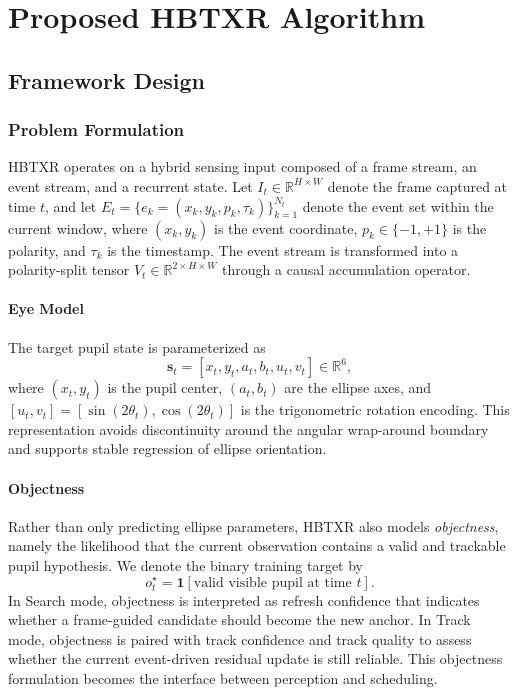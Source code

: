 \documentclass[journal]{IEEEtran}
\newcommand{\R}{\mathbb{R}}
\begin{document}
\section{Proposed HBTXR Algorithm}
\subsection{Framework Design}
\subsubsection{Problem Formulation}
HBTXR operates on a hybrid sensing input composed of a frame stream, an event stream, and a recurrent state. Let $I_t \in \R^{H\times W}$ denote the frame captured at time $t$, and let $E_t = \{e_k=(x_k,y_k,p_k,\tau_k)\}_{k=1}^{N_t}$ denote the event set within the current window, where $(x_k,y_k)$ is the event coordinate, $p_k \in \{-1,+1\}$ is the polarity, and $\tau_k$ is the timestamp. The event stream is transformed into a polarity-split tensor $V_t \in \R^{2\times H\times W}$ through a causal accumulation operator.

\paragraph*{Eye Model}
The target pupil state is parameterized as
\begin{equation}
\mathbf{s}_t = [x_t, y_t, a_t, b_t, u_t, v_t] \in \R^{6},
\end{equation}
where $(x_t,y_t)$ is the pupil center, $(a_t,b_t)$ are the ellipse axes, and $[u_t,v_t]=[\sin(2\theta_t),\cos(2\theta_t)]$ is the trigonometric rotation encoding. This representation avoids discontinuity around the angular wrap-around boundary and supports stable regression of ellipse orientation.

\paragraph*{Objectness}
Rather than only predicting ellipse parameters, HBTXR also models \emph{objectness}, namely the likelihood that the current observation contains a valid and trackable pupil hypothesis. We denote the binary training target by
\begin{equation}
o_t^{\star}=\mathbf{1}[\text{valid visible pupil at time } t].
\end{equation}
In Search mode, objectness is interpreted as refresh confidence that indicates whether a frame-guided candidate should become the new anchor. In Track mode, objectness is paired with track confidence and track quality to assess whether the current event-driven residual update is still reliable. This objectness formulation becomes the interface between perception and scheduling.
\end{document}
